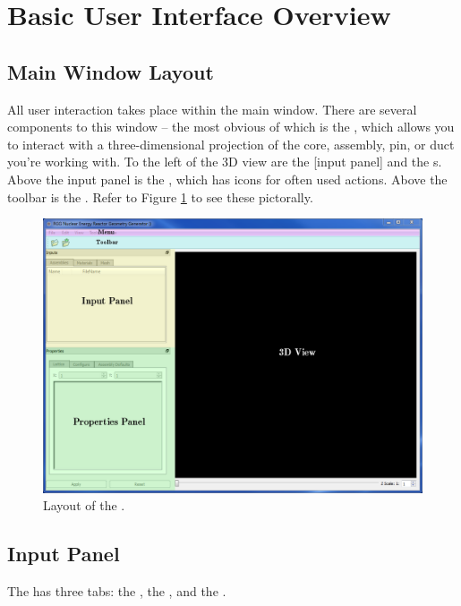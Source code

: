 \section{Basic User Interface Overview}
\subsection{Main Window Layout}
All user interaction takes place within the main window.  There are several components to this window -- the most obvious of which is the , which allows you to interact with a three-dimensional projection of the core, assembly, pin, or duct you're working with.  To the left of the 3D view are the [input panel] and the s.  Above the input panel is the , which has icons for often used actions.  Above the toolbar is the . Refer to Figure \ref{fig:mainwindow1} to see these pictorally.

\begin{figure}[H]
	\begin{center}
		\includegraphics[width=\linewidth]{Images/main-window-layout.png}
		\caption{Layout of the .}
		\label{fig:mainwindow1}
	\end{center}
\end{figure}


\subsection{Input Panel}
The  has three tabs: the , the , and the .

